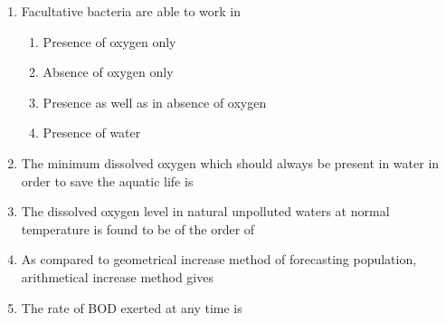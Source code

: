 \documentclass[11pt,a4paper]{article}
\begin{document}
\begin{enumerate}
\item{Facultative bacteria are able to work in}
\begin{enumerate}[label=\Alph*.]
\item{Presence of oxygen only}
\item{Absence of oxygen only}
\item{Presence as well as in absence of oxygen}
\item{Presence of water}
\end{enumerate}
\item{The minimum dissolved oxygen which should always be present in water in order to save the aquatic life is}
\\
\item{The dissolved oxygen level in natural unpolluted waters at normal temperature is found to be of the order of}
\\
\item{As compared to geometrical increase method of forecasting population, arithmetical increase method gives}
\\
\item{The rate of BOD exerted at any time is}
\begin{enumerate}[label=\Alph*.]

\end{enumerate}
\end{enumerate}
\end{document}
